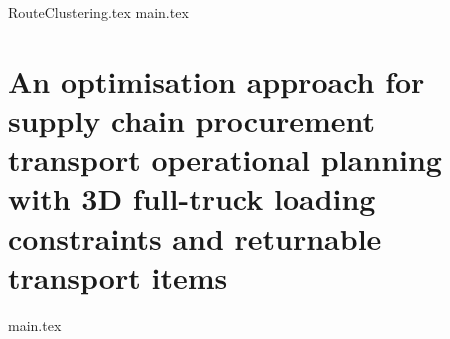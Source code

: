 \documentclass[tesi, crop, rm, english]{configuraciones/editorialupv}
\begin{document}
{RouteClustering.tex}
{main.tex}

\chapter{An optimisation approach for supply chain procurement transport operational planning with 3D full-truck loading constraints and returnable transport items}
{main.tex}





\cleardoublepage
{}
{}

\printindex


\end{document}
